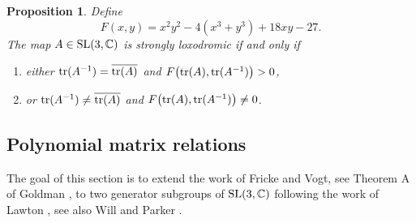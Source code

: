 \documentclass[11pt]{amsart}
\newtheorem{proposition}[theorem]{Proposition}
\numberwithin{equation}{section}
\begin{document}
\begin{proposition}\label{prop:nav-tr}
Define
$$
F(x,y)=x^2y^2-4(x^3+y^3)+18xy-27.
$$
The map $A\in{\rm SL}(3,{\mathbb C})$ is strongly loxodromic if and only if
\begin{enumerate}
\item[(1)] either ${\rm tr}(A^{-1})=\overline{{\rm tr}(A)}$ and $F\bigl({\rm tr}(A),{\rm tr}(A^{-1})\bigr)>0$, 
\item[(2)] or ${\rm tr}(A^{-1})\neq \overline{{\rm tr}(A)}$ and $F\bigl{(\rm tr}(A),{\rm tr}(A^{-1})\bigr)\neq 0$.
\end{enumerate}
\end{proposition}


 
\subsection{Polynomial matrix relations}


The goal of this section is to extend the work of Fricke and Vogt, see Theorem A of Goldman \cite{Gol1}, to two generator 
subgroups of ${\rm SL}(3,\mathbb{C})$ following the work of Lawton \cite{Law}, see also Will \cite{Will2} and Parker \cite{Par}. 
\end{document}
